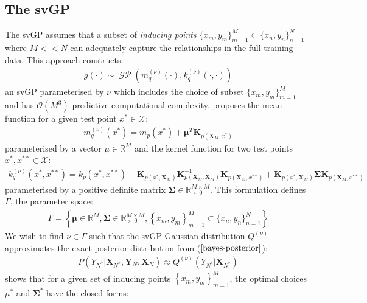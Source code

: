 \documentclass{article}
\newcommand{\GP}{\operatorname{\mathcal{GP}}}
\numberwithin{equation}{section}
\begin{document}
\subsection{The svGP}
The svGP assumes that a subset of \textit{inducing points} $\{x_m, y_m\}_{m=1}^{M} \subset \{x_n, y_n\}_{n=1}^{N}$ where $M << N$ can adequately capture the relationships in the full training data. This approach constructs:
\begin{align}
g(\cdot) \sim \GP\left(m_q^{(\nu)}(\cdot), k_q^{(\nu)}(\cdot, \cdot)\right)
\label{svgp}
\end{align}
an svGP  parameterised by $\nu$ which includes the choice of subset $\{x_m, y_m\}_{m=1}^{M}$ and has $\mathcal{O}(M^3)$ predictive computational complexity. \cite{titsias2009variational} proposes the mean function for a given test point $x^* \in \mathcal{X}$:
\begin{align}
    \label{svgp-mean} 
    m_q^{(\nu)}(x^*) = m_p(x^*) + \mathbf{\mu}^T\mathbf{K}_{p(\mathbf{X}_M, x^*)}
\end{align}
parameterised by a vector $\mu \in \mathbb{R}^M$ and the kernel function for two test points $x^*, x^{**} \in \mathcal{X}$:
\begin{align}
    \label{svgp-covariance}
    k_q^{(\nu)}(x^*, x^{**}) = k_p(x^*, x^{**}) - \mathbf{K}_{p(x^*, \mathbf{X}_M)} \mathbf{K}_{p(\mathbf{X}_M, \mathbf{X}_M)}^{-1}\mathbf{K}_{p(\mathbf{X}_M, x^{**})} + \mathbf{K}_{p(x^*, \mathbf{X}_M)} \mathbf{\Sigma}\mathbf{K}_{p(\mathbf{X}_M, x^{**})}
\end{align}
parameterised by a positive definite matrix $\mathbf{\Sigma} \in \mathbb{R}^{M\times M}_{\succ 0}$. This formulation defines $\Gamma$, the parameter space:
\begin{align}
    \Gamma = \left\{\mathbf{\mu} \in \mathbb{R}^{M}, \mathbf{\Sigma} \in \mathbb{R}^{M\times M}_{\succ 0}, \left\{x_m, y_m\right\}_{m=1}^{M} \subset \{x_n, y_n\}_{n=1}^{N}\right\}
    \label{svgp-parameter-space}
\end{align}
We wish to find $\nu \in \Gamma$ such that the svGP Gaussian distribution $Q^{(\nu)}$ approximates the exact posterior distribution from ($\ref{bayes-posterior}$):
\begin{align}
    P\left(Y_{N^*} \vert \mathbf{X}_{N^*}, \mathbf{Y}_N, \mathbf{X}_N\right) \approx Q^{(\nu)}\left(Y_{N^*} \vert \mathbf{X}_{N^*}\right)
\end{align}
\cite{titsias2009variational} shows that for a given set of inducing points $\left\{ x_m, y_m\right\}_{m=1}^M$, the optimal choices $\mu^*$ and $\mathbf{\Sigma}^*$ have the closed forms:
\end{document}
